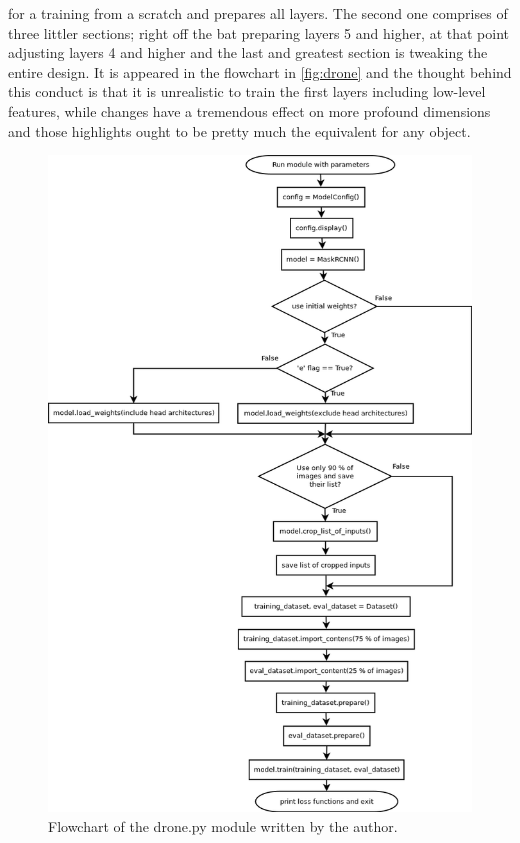for a training from a scratch and prepares all layers. The second one comprises of three littler sections; right off the bat preparing layers 5 and higher, at that point adjusting layers 4 and 
higher and the last and greatest section is tweaking the entire design. It is appeared in the flowchart in \ref{fig:drone} and the thought behind this conduct is that it is 
unrealistic to train the first layers including low-level features, while changes have a tremendous effect on more profound dimensions and those highlights ought to be pretty much the equivalent for any object.
\clearpage
\begin{figure}[H]
  \centering
  \includegraphics[width=0.8\linewidth]{images/drone-graph.png}
  \caption{Flowchart of the drone.py module written by the author.}
 \end{figure}
 \label{fig:drone}
 \clearpage


